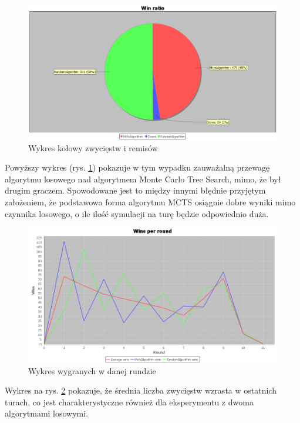 \begin{figure}[H]
	\centering
	\includegraphics[width=\textwidth]{Resources/MctsVsR/MctsVsRwin.PNG}
	\caption{Wykres kołowy zwycięstw i remisów} 
	\label{fig:MctsVsRwin}
\end{figure}

Powyższy wykres (rys. \ref{fig:MctsVsRwin}) pokazuje w tym wypadku zauważalną przewagę algorytmu losowego nad algorytmem Monte Carlo Tree Search, mimo, że był drugim graczem. Spowodowane jest to między innymi błędnie przyjętym założeniem, że podstawowa forma algorytmu MCTS osiągnie dobre wyniki mimo czynnika losowego, o ile ilość symulacji na turę będzie odpowiednio duża.

\begin{figure}[H]
	\centering
	\includegraphics[width=\textwidth]{Resources/MctsVsR/MctsVsRroundwin.PNG}
	\caption{Wykres wygranych w danej rundzie} 
	\label{fig:MctsVsRroundwin}
\end{figure}

Wykres na rys. \ref{fig:MctsVsRroundwin} pokazuje, że średnia liczba zwycięstw wzrasta w ostatnich turach, co jest charakterystyczne również dla eksperymentu z dwoma algorytmami losowymi.

